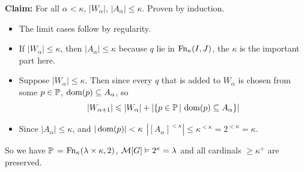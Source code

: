 \documentclass{article}
\begin{document}
    \textbf{Claim:} For all $\alpha < \kappa$, $|W_{\alpha}|, \, |A_{\alpha}| \leq \kappa$. Proven by induction. \begin{itemize}
        \item The limit cases follow by regularity.
        \item If $|W_{\alpha}| \leq \kappa$, then $|A_{\alpha}| \leq \kappa$ because $q$ lie in $\operatorname{Fn}_{\kappa}(I,J)$, the $\kappa$ is the important part here.
        \item Suppose $|W_{\alpha}| \leq \kappa$. Then since every $q$ that is added to $W_{\alpha}$ is chosen from some $p \in \mathbb{P}$, $\operatorname{dom}(p) \subseteq A_{\alpha}$, so \[ |W_{\alpha+1}| \leqslant |W_{\alpha}| + |\{ p \in \mathbb{P} \, | \, \operatorname{dom}(p)\subseteq A_{\alpha}\} | \]
        \item Since $|A_{\alpha}| \leq \kappa$, and $|\operatorname{dom}(p)| < \kappa$ %
              $|[A_{\alpha}]^{<\kappa}| \leq \kappa^{<\kappa} = 2^{<\kappa} = \kappa$.
    \end{itemize}
    So we have $\mathbb{P}$ = $\operatorname{Fn}_{\kappa}(\lambda \times \kappa, 2)$, $\mathcal{M}[G] \vDash 2^{\kappa} = \lambda$ and all cardinals $\geq \kappa^{+}$ are preserved.
    \newlec
\end{document}
